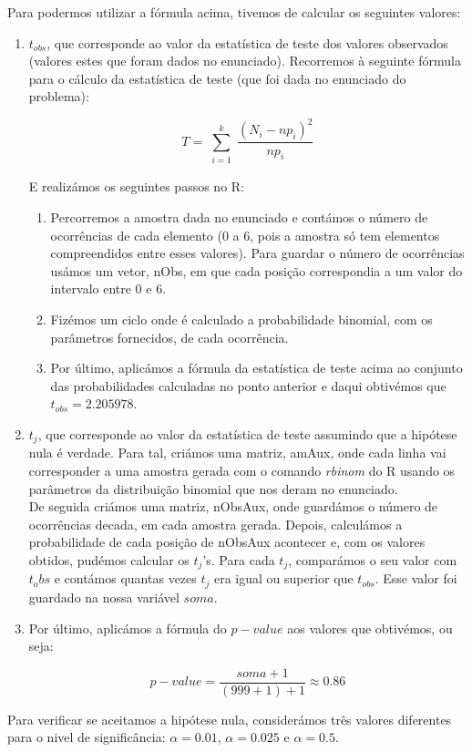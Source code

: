 \documentclass{article}
\begin{document}
				Para podermos utilizar a fórmula acima, tivemos de calcular os seguintes valores:
				\begin{enumerate}
					\item $t_{obs}$, que corresponde ao valor da estatística de teste dos valores observados (valores estes que foram dados no enunciado). Recorremos à seguinte fórmula para o cálculo da estatística de teste (que foi dada no enunciado do problema): 
				
				\begin{equation*}
					T = \sum_{\substack{i=1}}^{k} \frac{(N_i - np_i)^2}{np_i}
				\end{equation*}
				
				E  realizámos os seguintes passos no R:
				
				\begin{enumerate}
				 	\item Percorremos a amostra dada no enunciado e contámos o número de ocorrências de cada elemento (0 a 6, pois a amostra só tem elementos compreendidos entre esses valores). Para guardar o número de ocorrências usámos um vetor, nObs, em que cada posição correspondia a um valor do intervalo entre 0 e 6. 
				 	\item Fizémos um ciclo onde é calculado a probabilidade binomial, com os parâmetros fornecidos, de cada ocorrência.
				 	\item Por último, aplicámos a fórmula da estatística de teste acima ao conjunto das probabilidades calculadas no ponto anterior e daqui obtivémos que $t_{obs} = 2.205978$.
				\end{enumerate}
				 
					\item $t_j$, que corresponde ao valor da estatística de teste assumindo que a hipótese nula é verdade. Para tal, criámos uma matriz, amAux, onde cada linha vai corresponder a uma amostra gerada com o comando \textit{rbinom} do R usando os parâmetros da distribuição binomial que nos deram no enunciado.\\
						De seguida criámos uma matriz, nObsAux, onde guardámos o número de ocorrências decada, em cada amostra gerada.
						Depois, calculámos a probabilidade de cada posição de nObsAux acontecer e, com os valores obtidos, pudémos calcular os $t_j$'s. Para cada $t_j$, comparámos o seu valor com $t_obs$ e contámos quantas vezes $t_j$ era igual ou superior que $t_{obs}$. Esse valor foi guardado na nossa variável $soma$. 
				 	\item Por último, aplicámos a fórmula do $p-value$ aos valores que obtivémos, ou seja:

						\begin{equation*}
							p-value = \frac{soma + 1}{(999 + 1) + 1}\approx 0.86
						\end{equation*}
				
				\end{enumerate}
				Para verificar se aceitamos a hipótese nula, considerámos três valores diferentes para o nivel de significância: $\alpha = 0.01$,  $\alpha = 0.025$ e $\alpha = 0.5$. 
\end{document}
